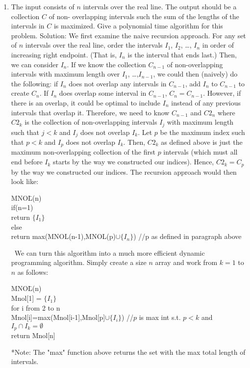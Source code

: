 \documentclass{article}
\begin{document}
\begin{enumerate}
\item The input consists of $n$ intervals over the real line. The output should be a collection $C$ of non-
\newline overlapping intervals such the sum of the lengths of the intervals in $C$ is maximized. Give a polynomial
\newline time algorithm for this problem.
\newline
\newline Solution: We first examine the naive recursion approach. For any set of $n$ intervals over the real line, order the intervals $I_1$, $I_2$, \ldots , $I_n$ in order of increasing right endpoint.  (That is, $I_n$ is the interval that ends last.)  Then, we can consider $I_n$.  If we know the collection $C_{n-1}$ of non-overlapping intervals with maximum length over $I_1$, \ldots ,$I_{n-1}$, we could then (naively) do the following: if $I_n$ does not overlap any intervals in $C_{n-1}$, add $I_n$ to $C_{n-1}$ to create $C_n$.  If $I_n$ does overlap some interval in $C_{n-1}$, $C_n=C_{n-1}$.  However, if there is an overlap, it could be optimal to include $I_n$ instead of any previous intervals that overlap it. Therefore, we need to know $C_{n-1}$ and $C2_{n}$ where $C2_{k}$ is the collection of non-overlapping intervals $I_j$ with maximum length such that $j<k$ and $I_j$ does not overlap $I_k$. Let $p$ be the maximum index such that $p<k$ and $I_p$ does not overlap $I_k$. Then, $C2_k$ as defined above is just the maximum non-overlapping collection of the first $p$ intervals (which must all end before $I_k$ starts by the way we constructed our indices).  Hence, $C2_k=C_p$ by the way we constructed our indices. The recursion approach would then look like:
\begin{tabbing}
MNO\= L(n)\= \\
\>if(n=1)\\
\>\>return $\{I_1\}$\\
\>else\\
\>\>return max(MNOL(n-1),MNOL(p)$\cup \{I_n\}$) //p as defined in paragraph above
\end{tabbing}
\ 
\newline We can turn this algorithm into a much more efficient dynamic programming algorithm.  Simply create a size $n$ array and work from $k=1$ to $n$ as follows:
\begin{tabbing}
MNO\= L(n)\= \\
\>Mnol[1] = $\{I_1\}$\\
\>for i from 2 to n\\
\>\>Mnol[i]=max(Mnol[i-1],Mnol[p]$\cup \{I_i\}$) //$p$ is max int s.t. $p<k$ and $I_p\cap I_k=\emptyset $\\
\>return Mnol[n]
\end{tabbing}
*Note: The "max" function above returns the set with the max total length of intervals.
\end{enumerate}
\end{document}
